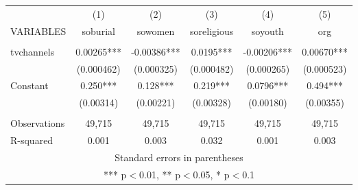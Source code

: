 \begin{tabular}{lccccc} \hline
 & (1) & (2) & (3) & (4) & (5) \\
VARIABLES & soburial & sowomen & soreligious & soyouth & org \\ \hline
 &  &  &  &  &  \\
tvchannels & 0.00265*** & -0.00386*** & 0.0195*** & -0.00206*** & 0.00670*** \\
 & (0.000462) & (0.000325) & (0.000482) & (0.000265) & (0.000523) \\
Constant & 0.250*** & 0.128*** & 0.219*** & 0.0796*** & 0.494*** \\
 & (0.00314) & (0.00221) & (0.00328) & (0.00180) & (0.00355) \\
 &  &  &  &  &  \\
Observations & 49,715 & 49,715 & 49,715 & 49,715 & 49,715 \\
 R-squared & 0.001 & 0.003 & 0.032 & 0.001 & 0.003 \\ \hline
\multicolumn{6}{c}{ Standard errors in parentheses} \\
\multicolumn{6}{c}{ *** p$<$0.01, ** p$<$0.05, * p$<$0.1} \\
\end{tabular}
